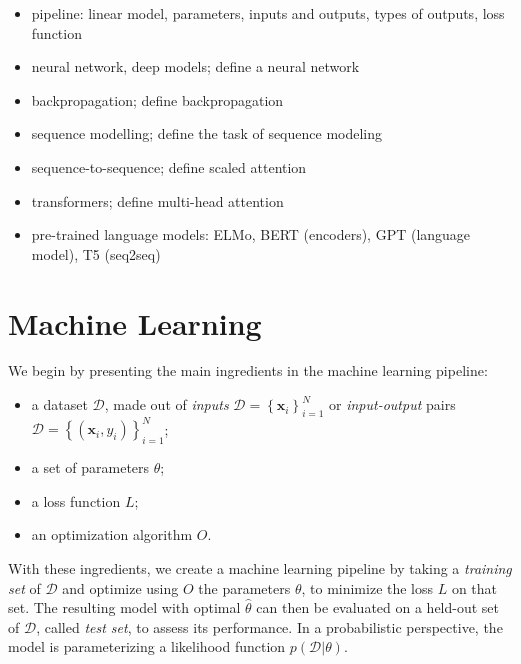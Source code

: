 \begin{itemize}
    \item pipeline: linear model, parameters, inputs and outputs, types of outputs, loss function
    \item neural network, deep models; define a neural network
    \item backpropagation; define backpropagation
    \item sequence modelling; define the task of sequence modeling
    \item sequence-to-sequence; define scaled attention
    \item transformers; define multi-head attention
    \item pre-trained language models: ELMo, BERT (encoders), GPT (language model), T5 (seq2seq)
\end{itemize}

\section{Machine Learning}
\label{sec:ml-primer}

We begin by presenting the main ingredients in the machine learning pipeline:
%
\begin{itemize}
    \item a dataset $\mathcal{D}$, made out of
          \textit{inputs} $\mathcal{D}=\left\{\bm{x}_i\right\}_{i=1}^N$ or
          \textit{input-output} pairs
          $\mathcal{D}=\left\{(\bm{x}_i,y_i)\right\}_{i=1}^N$;
    \item a set of parameters $\theta$;
    \item a loss function $L$;
    \item an optimization algorithm $O$.
\end{itemize}
%
With these ingredients, we create a machine learning pipeline by
taking a \textit{training set} of $\mathcal{D}$ and optimize using $O$
the parameters $\theta$, to minimize the loss
$L$ on that set. The resulting model with optimal
$\hat{\theta}$ can then be evaluated on a held-out set of
$\mathcal{D}$, called \textit{test set}, to assess its performance.
In a probabilistic perspective, the model is parameterizing a likelihood
function $p(\mathcal{D}|\theta)$.

